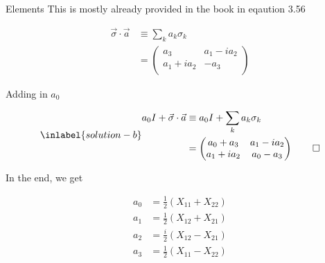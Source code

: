 \begin{answer}
\begin{answerpart}{Elements}
    This is mostly already provided in the book in eqaution 3.56

    \begin{equation*}
      \tag{3.56}
      \begin{split}
        \vec{\sigma} \cdot \vec{a} &\equiv \sum_k a_k \sigma_k \\
        &= \begin{pmatrix}
          a_3        & a_1 - ia_2 \\
          a_1 + ia_2 & -a_3 \\
        \end{pmatrix}
      \end{split}
    \end{equation*}

    Adding in $a_0$
    
    \begin{equation}
      \inlabel{solution-b}
      \begin{split}
        a_0I +
        \vec{\sigma} \cdot \vec{a}
        &\equiv a_0I + \sum_k a_k \sigma_k \\
        &= \begin{pmatrix}
          a_0 + a_3  & a_1 - ia_2 \\
          a_1 + ia_2 & a_0 - a_3 \\
        \end{pmatrix}
        \qed
      \end{split}
    \end{equation}

    In the end, we get

    \begin{equation}
      \begin{split}
        a_0 &= \frac{1}{2}(X_{11} + X_{22})\\
        a_1 &= \frac{1}{2}(X_{12} + X_{21})\\
        a_2 &= \frac{i}{2}(X_{12} - X_{21})\\
        a_3 &= \frac{1}{2}(X_{11} - X_{22})\\
      \end{split}
    \end{equation}

  \end{answerpart}
\end{answer}
